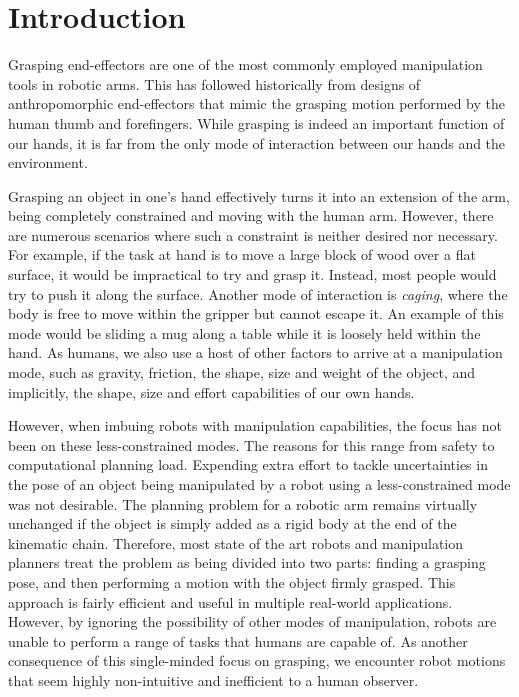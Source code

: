 \documentclass[runningheads,letterpaper]{llncs}
\begin{document}

\section{Introduction} \label{sec:intro}
Grasping end-effectors are one of the most commonly employed manipulation tools in robotic arms. This has followed historically from designs of anthropomorphic end-effectors that mimic the grasping motion performed by the human thumb and forefingers. While grasping is indeed an important function of our hands, it is far from the only mode of interaction between our hands and the environment.

Grasping an object in one's hand effectively turns it into an extension of the arm, being completely constrained and moving with the human arm. However, there are numerous scenarios where such a constraint is neither desired nor necessary. For example, if the task at hand is to move a large block of wood over a flat surface, it would be impractical to try and grasp it. Instead, most people would try to push it along the surface. Another mode of interaction is \textit{caging}, where the body is free to move within the gripper but cannot escape it. An example of this mode would be sliding a mug along a table while it is loosely held within the hand. As humans, we also use a host of other factors to arrive at a manipulation mode, such as gravity, friction, the shape, size and weight of the object, and implicitly, the shape, size and effort capabilities of our own hands.  

However, when imbuing robots with manipulation capabilities, the focus has not been on these less-constrained modes. The reasons for this range from safety to computational planning load. Expending extra effort to tackle uncertainties in the pose of an object being manipulated by a robot using a less-constrained mode was not desirable. The planning problem for a robotic arm remains virtually unchanged if the object is simply added as a rigid body at the end of the kinematic chain. Therefore, most state of the art robots and manipulation planners treat the problem as being divided into two parts: finding a grasping pose, and then performing a motion with the object firmly grasped. This approach is fairly efficient and useful in multiple real-world applications. However, by ignoring the possibility of other modes of manipulation, robots are unable to perform a range of tasks that humans are capable of. As another consequence of this single-minded focus on grasping, we encounter robot motions that seem highly non-intuitive and inefficient to a human observer.       
\end{document}
